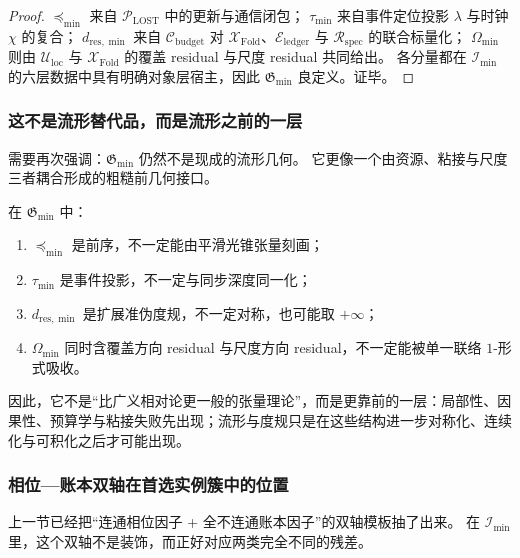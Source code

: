 \begin{proof}
\(\preceq_{\min}\) 来自 \(\mathcal P_{\mathrm{LOST}}\) 中的更新与通信闭包；
\(\tau_{\min}\) 来自事件定位投影 \(\lambda\) 与时钟 \(\chi\) 的复合；
\(d_{\mathrm{res},\min}\) 来自 \(\mathcal C_{\mathrm{budget}}\) 对 \(\mathcal X_{\mathrm{Fold}}\)、\(\mathcal E_{\mathrm{ledger}}\) 与 \(\mathcal R_{\mathrm{spec}}\) 的联合标量化；
\(\Omega_{\min}\) 则由 \(\mathcal U_{\mathrm{loc}}\) 与 \(\mathcal X_{\mathrm{Fold}}\) 的覆盖 residual 与尺度 residual 共同给出。
各分量都在 \(\mathcal I_{\min}\) 的六层数据中具有明确对象层宿主，因此 \(\mathfrak G_{\min}\) 良定义。证毕。
\end{proof}

\subsubsection{这不是流形替代品，而是流形之前的一层}\label{subsubsec:typed-address-biaxial-completion-preferred-minimal-instantiation-before-manifold}
需要再次强调：\(\mathfrak G_{\min}\) 仍然不是现成的流形几何。
它更像一个由资源、粘接与尺度三者耦合形成的粗糙前几何接口。

\begin{remark}[为何它先于流形]\label{rem:typed-address-biaxial-completion-preferred-minimal-instantiation-before-manifold}
在 \(\mathfrak G_{\min}\) 中：
\begin{enumerate}
  \item \(\preceq_{\min}\) 是前序，不一定能由平滑光锥张量刻画；
  \item \(\tau_{\min}\) 是事件投影，不一定与同步深度同一化；
  \item \(d_{\mathrm{res},\min}\) 是扩展准伪度规，不一定对称，也可能取 \(+\infty\)；
  \item \(\Omega_{\min}\) 同时含覆盖方向 residual 与尺度方向 residual，不一定能被单一联络 \(1\)-形式吸收。
\end{enumerate}
因此，它不是“比广义相对论更一般的张量理论”，而是更靠前的一层：局部性、因果性、预算学与粘接失败先出现；流形与度规只是在这些结构进一步对称化、连续化与可积化之后才可能出现。
\end{remark}

\subsubsection{相位—账本双轴在首选实例簇中的位置}\label{subsubsec:typed-address-biaxial-completion-preferred-minimal-instantiation-phase-ledger}
上一节已经把“连通相位因子 + 全不连通账本因子”的双轴模板抽了出来。
在 \(\mathcal I_{\min}\) 里，这个双轴不是装饰，而正好对应两类完全不同的残差。

